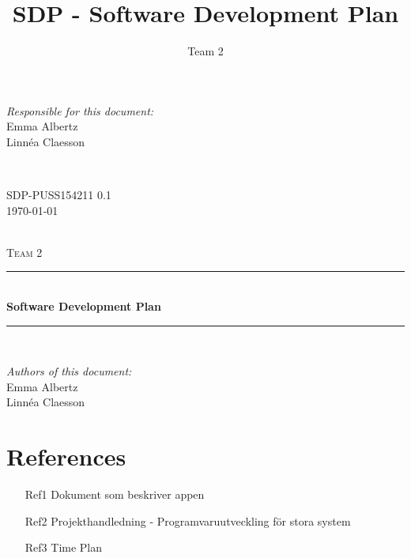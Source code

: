 \documentclass[a4paper]{article}
\title{SDP - Software Development Plan}
\author{Team 2}
\begin{document}
\begin{titlepage}
\newcommand{\HRule}{\rule{\linewidth}{0.5mm}}

\begin{minipage}{0.5\textwidth}
\begin{flushleft} %
\textit{Responsible for this document:}\\
Emma Albertz \\
Linnéa Claesson
\end{flushleft}
\end{minipage}
~
\begin{minipage}{0.4\textwidth}
\begin{flushright}
SDP-PUSS154211 0.1 \\
\today
\end{flushright}
\end{minipage}\\[3cm]

\centering
\textsc{\LARGE Team 2}\\[0.5cm]

\HRule \\[0.4cm]
{ \huge \bfseries Software Development Plan}\\[0.4cm] %
\HRule \\[1.5cm]

\vfill
\begin{flushleft}
\textit{Authors of this document:}\\
Emma Albertz \\
Linnéa Claesson
\end{flushleft}



\end{titlepage}
\setcounter{tocdepth}{2}
\tableofcontents
\newpage
{}

\section{References}
\begin{itemize}
\item[Ref1] Dokument som beskriver appen
\item[Ref2] Projekthandledning - Programvaruutveckling för stora system
\item[Ref3] Time Plan
\end{itemize}
\end{document}
